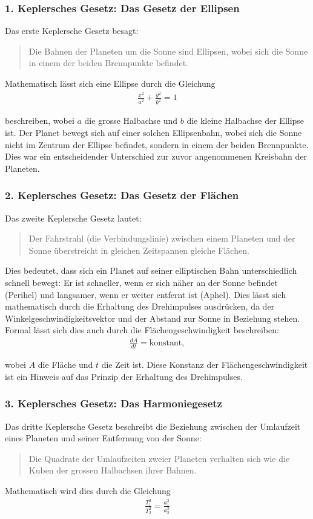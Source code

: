 \documentclass[a4paper,12pt,twoside]{article}
\begin{document}
\subsubsection{1. Keplersches Gesetz: Das Gesetz der Ellipsen}
Das erste Keplersche Gesetz besagt:
\begin{quote}
    Die Bahnen der Planeten um die Sonne sind Ellipsen, wobei sich die Sonne in einem der beiden Brennpunkte befindet.
\end{quote}
Mathematisch lässt sich eine Ellipse durch die Gleichung
\begin{align*}
	\frac{x^2}{a^2} + \frac{y^2}{b^2} = 1
\end{align*}

beschreiben, wobei \(a\) die grosse Halbachse und \(b\) die kleine Halbachse der 
Ellipse ist. Der Planet bewegt sich auf einer solchen Ellipsenbahn, wobei sich 
die Sonne nicht im Zentrum der Ellipse befindet, sondern in einem der beiden Brennpunkte.
Dies war ein entscheidender Unterschied zur zuvor angenommenen Kreisbahn der Planeten.
\subsubsection{2. Keplersches Gesetz: Das Gesetz der Flächen}
Das zweite Keplersche Gesetz lautet:

\begin{quote}
    Der Fahrstrahl (die Verbindungslinie) zwischen einem Planeten und der Sonne überstreicht in gleichen Zeitspannen gleiche Flächen.
\end{quote}
Dies bedeutet, dass sich ein Planet auf seiner elliptischen Bahn unterschiedlich 
schnell bewegt: Er ist schneller, wenn er sich näher an der Sonne befindet (Perihel) 
und langsamer, wenn er weiter entfernt ist (Aphel). Dies lässt sich mathematisch durch 
die Erhaltung des Drehimpulses ausdrücken, da der Winkelgeschwindigkeitsvektor und 
der Abstand zur Sonne in Beziehung stehen. Formal lässt sich dies auch durch die 
Flächengeschwindigkeit beschreiben:
\begin{align*}
	\frac{dA}{dt} = \text{konstant},
\end{align*}

wobei \(A\) die Fläche und \(t\) die Zeit ist. Diese Konstanz der Flächengeschwindigkeit 
ist ein Hinweis auf das Prinzip der Erhaltung des Drehimpulses.

\subsubsection{3. Keplersches Gesetz: Das Harmoniegesetz}
Das dritte Keplersche Gesetz beschreibt die Beziehung zwischen der Umlaufzeit eines 
Planeten und seiner Entfernung von der Sonne:
\begin{quote}
    Die Quadrate der Umlaufzeiten zweier Planeten verhalten sich wie die Kuben der 
    grossen Halbachsen ihrer Bahnen.
\end{quote}
Mathematisch wird dies durch die Gleichung
\begin{align*}
	\frac{T_1^2}{T_2^2} = \frac{a_1^3}{a_2^3}
\end{align*}
\end{document}
